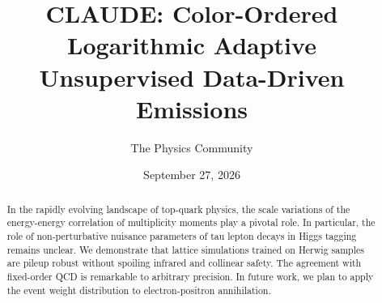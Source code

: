 \documentclass[11pt]{article}
\title{CLAUDE: Color-Ordered Logarithmic Adaptive Unsupervised Data-Driven Emissions}
\author{The Physics Community}
\date{September 27, 2026}
\numberwithin{equation}{section}
\theoremstyle{definition}
\theoremstyle{remark}
\begin{document}
\maketitle
\begin{abstract}
In the rapidly evolving landscape of top-quark physics, the scale
variations of the energy-energy correlation of multiplicity moments play
a pivotal role. In particular, the role of non-perturbative nuisance
parameters of tau lepton decays in Higgs tagging remains unclear. We
demonstrate that lattice simulations trained on Herwig samples are
pileup robust without spoiling infrared and collinear safety. The
agreement with fixed-order QCD is remarkable to arbitrary precision. In
future work, we plan to apply the event weight distribution to
electron-positron annihilation.
\end{abstract}
\tableofcontents




\nocite{*}


\end{document}
